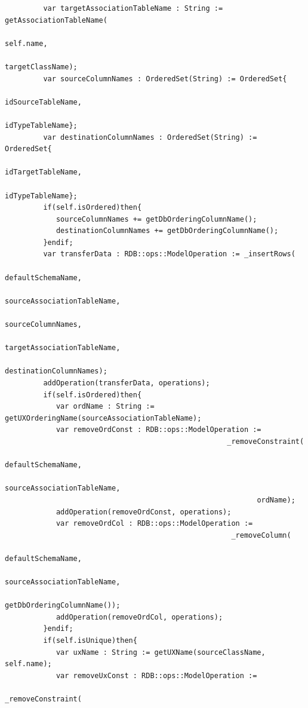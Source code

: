 \documentclass[11pt,twoside,a4paper]{book}
\begin{document}
\begin{verbatim}
         var targetAssociationTableName : String := getAssociationTableName(
                                                                     self.name,
                                                                     targetClassName);
         var sourceColumnNames : OrderedSet(String) := OrderedSet{
                                                            idSourceTableName,
                                                            idTypeTableName};
         var destinationColumnNames : OrderedSet(String) := OrderedSet{
                                                               idTargetTableName,
                                                               idTypeTableName};
         if(self.isOrdered)then{ 
            sourceColumnNames += getDbOrderingColumnName();
            destinationColumnNames += getDbOrderingColumnName();
         }endif;
         var transferData : RDB::ops::ModelOperation := _insertRows(
                                                            defaultSchemaName,
                                                            sourceAssociationTableName,
                                                            sourceColumnNames,
                                                            targetAssociationTableName,
                                                            destinationColumnNames);
         addOperation(transferData, operations);
         if(self.isOrdered)then{
            var ordName : String := getUXOrderingName(sourceAssociationTableName); 
            var removeOrdConst : RDB::ops::ModelOperation := 
                                                    _removeConstraint(
                                                           defaultSchemaName,
                                                           sourceAssociationTableName,
                                                           ordName);
            addOperation(removeOrdConst, operations);
            var removeOrdCol : RDB::ops::ModelOperation := 
                                                     _removeColumn(
                                                         defaultSchemaName,
                                                         sourceAssociationTableName,
                                                         getDbOrderingColumnName());
            addOperation(removeOrdCol, operations);
         }endif;
         if(self.isUnique)then{
            var uxName : String := getUXName(sourceClassName, self.name);
            var removeUxConst : RDB::ops::ModelOperation := 
                                                      _removeConstraint(

\end{verbatim}
\end{document}
